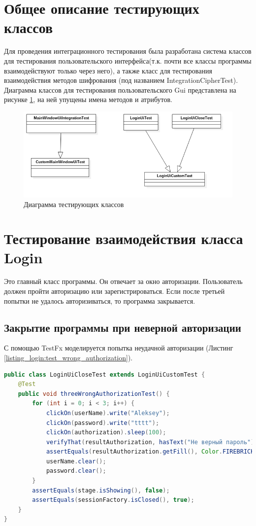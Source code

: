 \documentclass[a4paper,12pt]{article}
\begin{document}
\newpage\section{Общее описание тестирующих классов}
Для проведения интеграционного тестирования была разработана система классов для тестирования пользовательского интерфейса(т.к. почти все классы программы взаимодействуют только через него), а также класс для тестирования взаимодействия методов шифрования (под названием IntegrationCipherTest). Диаграмма классов для тестирования пользовательского Gui представлена на рисунке \ref{fig:class_diagram_test_gui}, на ней упущены имена методов и атрибутов.
\begin{center}
	\begin{figure}[h!]
		\centering
   		\includegraphics[scale=0.6]{img/class_diagram_testing.png}
   		\caption{Диаграмма тестирующих классов}
   		\label{fig:class_diagram_test_gui}
    \end{figure}
\end{center}


\newpage\section{Тестирование взаимодействия класса Login}
Это главный класс программы. Он отвечает за окно авторизации. Пользователь должен пройти авторизацию или зарегистрироваться. Если после третьей попытки не удалось авторизиваться, то программа закрывается.
\subsection{Закрытие программы при неверной авторизации}
С помощью TestFx моделируется попытка неудачной авторизации (Листинг \ref{listing_login:test_wrong_authorization}).
\begin{lstlisting}[language=java, caption=Тестирование неверной авторизации, label=listing_login:test_wrong_authorization]
public class LoginUiCloseTest extends LoginUiCustomTest {
    @Test
    public void threeWrongAuthorizationTest() {
        for (int i = 0; i < 3; i++) {
            clickOn(userName).write("Aleksey");
            clickOn(password).write("tttt");
            clickOn(authorization).sleep(100);
            verifyThat(resultAuthorization, hasText("Не верный пароль"));
            assertEquals(resultAuthorization.getFill(), Color.FIREBRICK);
            userName.clear();
            password.clear();
        }
        assertEquals(stage.isShowing(), false);
        assertEquals(sessionFactory.isClosed(), true);
    }
}
\end{lstlisting}
\end{document}
